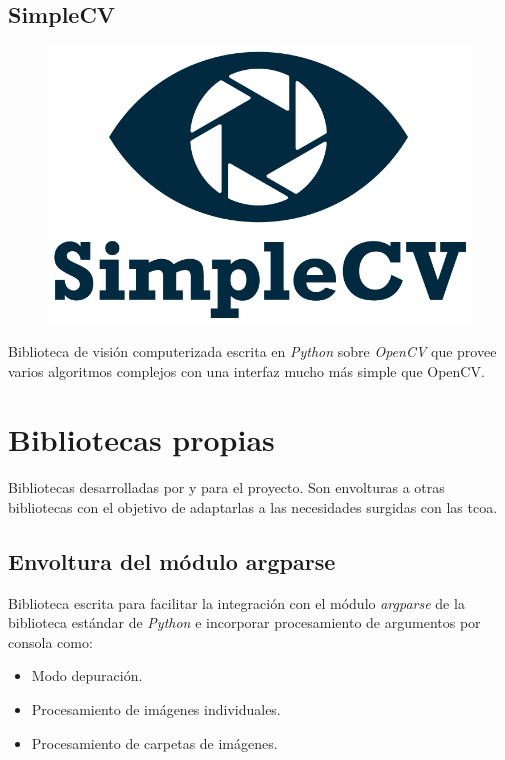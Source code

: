\subsection{SimpleCV}
\begin{figure}[H]
  \hspace*{1.7cm}
  \includegraphics[scale=0.3]{imagenes/logos/simplecv_logo.png}
\end{figure}
Biblioteca de visión computerizada escrita en \emph{Python} sobre
\emph{OpenCV} que provee varios algoritmos complejos con una interfaz
mucho más simple que OpenCV\@.

\section{Bibliotecas propias}

Bibliotecas desarrolladas por y para el proyecto. Son envolturas a
otras bibliotecas con el objetivo de adaptarlas a las necesidades
surgidas con las \gls{tcoa}.

\subsection{Envoltura del módulo argparse}
Biblioteca escrita para facilitar la integración con el módulo
\emph{argparse} de la biblioteca estándar de \emph{Python} e
incorporar procesamiento de argumentos por consola como:
\begin{itemize}
\item Modo depuración.
\item Procesamiento de imágenes individuales.
\item Procesamiento de carpetas de imágenes.
\end{itemize}

